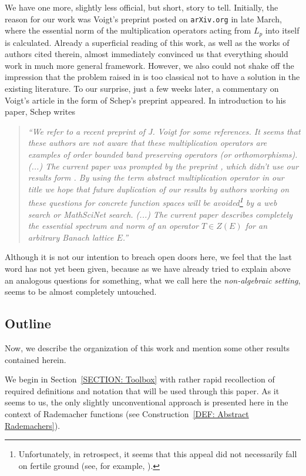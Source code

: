 \documentclass[11pt]{amsart}
\theoremstyle{definition}
\theoremstyle{definition}
\theoremstyle{definition}
\theoremstyle{definition}
\theoremstyle{definition}
\theoremstyle{definition}
\theoremstyle{definition}
\theoremstyle{definition}
\numberwithin{equation}{section}
\numberwithin{equation}{section}
\numberwithin{equation}{section}
\theoremstyle{definition}
\theoremstyle{definition}
\theoremstyle{definition}
\theoremstyle{definition}
\theoremstyle{definition}
\theoremstyle{definition}
\begin{document}
We have one more, slightly less official, but short, story to tell. Initially, the reason for our work was Voigt's
preprint \cite{Voi22} posted on {\tt arXiv.org} in late March, where the essential norm of the multiplication operators acting from $L_p$ into itself is calculated.
Already a superficial reading of this work, as well as the works of authors cited therein, almost immediately convinced us that everything should work
in much more general framework. However, we also could not shake off the impression that the problem raised in \cite{Voi22} is too classical not to have
a solution in the existing literature. 
To our surprise, just a few weeks later, a commentary on Voigt's article in the form of Schep's preprint \cite{Sch22} appeared. In introduction to his paper, Schep writes
\begin{quote}
	\begin{small}
		{\it \enquote{We refer to a recent preprint of J. Voigt \cite{Voi22} for some references. It seems that these authors are not aware that these multiplication
		operators are examples of order bounded band preserving operators (or orthomorphisms). (...) The current paper was prompted by the preprint \cite{Voi22},
		which didn't use our results form \cite{Sch80}. By using the term abstract multiplication operator in our title we hope that future duplication
		of our results by authors working on these questions for concrete function spaces will be avoided\footnote{Unfortunately, in retrospect, it seems
		that this appeal did not necessarily fall on fertile ground (see, for example, \cite{RFRSSB24}).} by a web search or MathSciNet search.
		(...) The current paper describes completely the essential spectrum and norm of an operator $T \in Z(E)$ for an arbitrary Banach lattice $E$.}}
	\end{small}
\end{quote}
Although it is not our intention to breach open doors here, we feel that the last word has not yet been given, because as we have already tried to explain above
an analogous questions for something, what we call here the {\it non-algebraic setting}, seems to be almost completely untouched.

\subsection{Outline}

Now, we describe the organization of this work and mention some other results contained herein.

We begin in Section~\ref{SECTION: Toolbox} with rather rapid recollection of required definitions and notation that will be used through this paper.
As it seems to us, the only slightly unconventional approach is presented here in the context of Rademacher functions (see Construction~\ref{DEF: Abstract Rademachers}).
\end{document}
